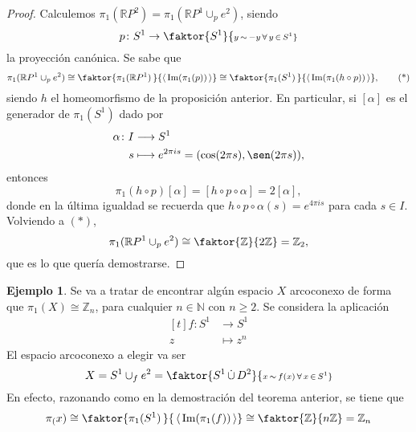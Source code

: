 \documentclass[11pt]{report}
\theoremstyle{definition}
\theoremstyle{definition}
\newtheorem{example}{Ejemplo}[chapter]
\theoremstyle{remark}
\newcommand{\R}{\mathbb R}
\newcommand{\N}{\mathbb N}
\newcommand{\Z}{\mathbb Z}
\begin{document}
\begin{proof}
Calculemos $\pi_1(\R P^2) = \pi_1(\R P^1 \cup_p e^2)$, siendo 
\[p \colon S^1 \to \faktor{S^1}{\scriptstyle{y \, \sim \, -y \, \forall \, y \, \in \, S^1}}\]
la proyección canónica. Se sabe que
\[\pi_1(\R P^1 \cup_p e^2) \cong \faktor{\pi_1(\R P^1) \,}{\langle\, \textup{Im}(\pi_1(p)) \,\rangle} \cong \faktor{\pi_1(S^1)\,}{\langle\, \textup{Im}(\pi_1(h \circ p))\, \rangle}, \tag{*}\]
siendo $h$ el homeomorfismo de la proposición anterior. En particular, si $[\alpha]$ es el generador de $\pi_1(S^1)$ dado por
\[\begin{aligned}[t]
    \alpha \colon I &\longrightarrow S^1 \\
    s &\longmapsto e^{2\pi is} = (\cos (2\pi s),\sen(2\pi s)),
\end{aligned}\]
entonces
\[\pi_1(h \circ p)[\alpha] = [h \circ p \circ \alpha] = 2[\alpha],\]
donde en la última igualdad se recuerda que $h \circ p \circ \alpha(s)= e^{4\pi is}$ para cada $s \in I$. Volviendo a $(*)$,
\[\pi_1(\R P^1 \cup_p e^2) \cong \faktor{\Z}{2\Z} = \Z_2,\]
que es lo que quería demostrarse.
\end{proof}

\begin{example}
Se va a tratar de encontrar algún espacio $X$ arcoconexo de forma que $\pi_1(X) \cong \Z_n$, para cualquier $n \in \N$ con $n \geq 2$. Se considera la aplicación
\[\begin{aligned}[t]
    f \colon S^1 &\longrightarrow S^1 \\
    z &\longmapsto z^n
\end{aligned}\]
El espacio arcoconexo a elegir va ser
\[X = S^1 \cup_f e^2 = \faktor{S^1 \, \dot\cup \, D^2}{\scriptstyle{x \, \sim \, f(x) \, \forall \, x \, \in \, S^1}}\]
En efecto, razonando como en la demostración del teorema anterior, se tiene que
\[\pi_(x) \cong \faktor{\pi_1(S^1) \,}{\, \langle \, \textup{Im}(\pi_1(f))\, \rangle} \cong \faktor{\Z}{n\Z} = \Z_n\]
\end{example}



\cleardoublepage
{}
{}




\end{document}
